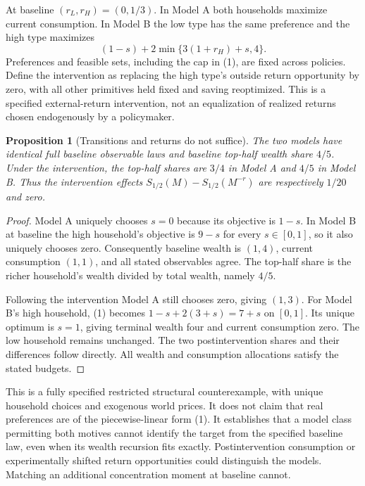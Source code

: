 \documentclass[11pt]{article}
\newtheorem{proposition}[theorem]{Proposition}
\theoremstyle{remark}
\begin{document}
At baseline $(r_L,r_H)=(0,1/3)$. In Model A both households maximize
current consumption. In Model B the low type has the same preference and
the high type maximizes
\[
 (1-s)+2\min\{3(1+r_H)+s,4\}.
 \tag{1}
\]
Preferences and feasible sets, including the cap in (1), are fixed across
policies. Define the intervention as replacing the high type's outside
return opportunity by zero, with all other primitives held fixed and
saving reoptimized. This is a specified external-return intervention, not
an equalization of realized returns chosen endogenously by a policymaker.

\begin{proposition}[Transitions and returns do not suffice]
The two models have identical full baseline observable laws and baseline
top-half wealth share $4/5$. Under the intervention, the top-half shares
are $3/4$ in Model A and $4/5$ in Model B. Thus the intervention effects
$S_{1/2}(M)-S_{1/2}(M^{-r})$ are respectively $1/20$ and zero.
\end{proposition}
\begin{proof}
Model A uniquely chooses $s=0$ because its objective is $1-s$.
In Model B at baseline the high household's objective is $9-s$ for every
$s\in[0,1]$, so it also uniquely chooses zero. Consequently baseline
wealth is $(1,4)$, current consumption $(1,1)$, and all stated observables
agree. The top-half share is the richer household's wealth divided by
total wealth, namely $4/5$.

Following the intervention Model A still chooses zero, giving $(1,3)$.
For Model B's high household, (1) becomes
$1-s+2(3+s)=7+s$ on $[0,1]$. Its unique optimum is $s=1$, giving
terminal wealth four and current consumption zero. The low household
remains unchanged. The two postintervention shares and their differences
follow directly. All wealth and consumption allocations satisfy the
stated budgets.
\end{proof}
This is a fully specified restricted structural counterexample, with
unique household choices and exogenous world prices. It does not claim
that real preferences are of the piecewise-linear form (1). It establishes
that a model class permitting both motives cannot identify the target from
the specified baseline law, even when its wealth recursion fits exactly.
Postintervention consumption or experimentally shifted return opportunities
could distinguish the models. Matching an additional concentration moment
at baseline cannot.
\end{document}
